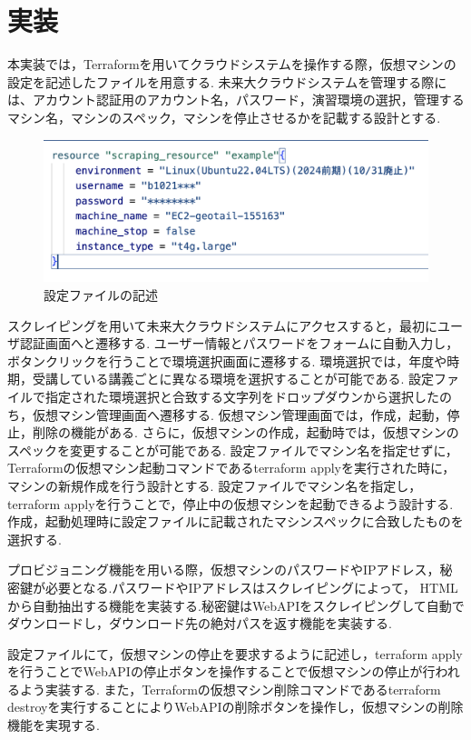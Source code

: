 \documentclass[11pt]{ujarticle}\sloppy
\begin{document}
\section{実装}



本実装では，Terraformを用いてクラウドシステムを操作する際，仮想マシンの設定を記述したファイルを用意する.
未来大クラウドシステムを管理する際には、アカウント認証用のアカウント名，パスワード，演習環境の選択，管理するマシン名，マシンのスペック，マシンを停止させるかを記載する設計とする.


\begin{figure}[h]
	\includegraphics[width=1\linewidth]{./images/machine.png}
	\caption{設定ファイルの記述}
  \label{fig:machien}
\end{figure}


スクレイピングを用いて未来大クラウドシステムにアクセスすると，最初にユーザ認証画面へと遷移する.
ユーザー情報とパスワードをフォームに自動入力し，ボタンクリックを行うことで環境選択画面に遷移する.
環境選択では，年度や時期，受講している講義ごとに異なる環境を選択することが可能である.
設定ファイルで指定された環境選択と合致する文字列をドロップダウンから選択したのち，仮想マシン管理画面へ遷移する.
仮想マシン管理画面では，作成，起動，停止，削除の機能がある.
さらに，仮想マシンの作成，起動時では，仮想マシンのスペックを変更することが可能である.
設定ファイルでマシン名を指定せずに，Terraformの仮想マシン起動コマンドであるterraform applyを実行された時に，マシンの新規作成を行う設計とする.
設定ファイルでマシン名を指定し，terraform applyを行うことで，停止中の仮想マシンを起動できるよう設計する.作成，起動処理時に設定ファイルに記載されたマシンスペックに合致したものを選択する.

プロビジョニング機能を用いる際，仮想マシンのパスワードやIPアドレス，秘密鍵が必要となる.パスワードやIPアドレスはスクレイピングによって，
HTMLから自動抽出する機能を実装する.秘密鍵はWebAPIをスクレイピングして自動でダウンロードし，ダウンロード先の絶対パスを返す機能を実装する.


設定ファイルにて，仮想マシンの停止を要求するように記述し，terraform applyを行うことでWebAPIの停止ボタンを操作することで仮想マシンの停止が行われるよう実装する.
また，Terraformの仮想マシン削除コマンドであるterraform destroyを実行することによりWebAPIの削除ボタンを操作し，仮想マシンの削除機能を実現する.
\end{document}
